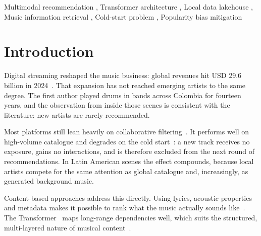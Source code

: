 \documentclass[]{ceurart}
\begin{document}
\begin{keywords}
Multimodal recommendation \sep
Transformer architecture \sep
Local data lakehouse \sep
Music information retrieval \sep
Cold-start problem \sep
Popularity bias mitigation
\end{keywords}

\maketitle

\section{Introduction}
\label{sec:introduction}

Digital streaming reshaped the music business: global revenues hit USD 29.6
billion in 2024~\cite{ifpi2025report}. That expansion has not reached emerging
artists to the same degree. The first author played drums in bands across
Colombia for fourteen years, and the observation from inside those scenes is
consistent with the literature: new artists are rarely recommended.

Most platforms still lean heavily on collaborative filtering~\cite{ricci2015recommender}.
It performs well on high-volume catalogue and degrades on the cold
start~\cite{schein2002methods,adomavicius2005toward}: a new track receives no
exposure, gains no interactions, and is therefore excluded from the next
round of recommendations. In Latin American scenes the effect compounds,
because local artists compete for the same attention as global catalogue and,
increasingly, as generated background music.

Content-based approaches address this directly. Using lyrics, acoustic
properties and metadata makes it possible to rank what the music actually
sounds like~\cite{ricci2015recommender,aggarwal2016recommender}. The
Transformer~\cite{vaswani2017attention} maps long-range dependencies well, which
suits the structured, multi-layered nature of musical
content~\cite{baltruvsaitis2019multimodal}.
\end{document}
